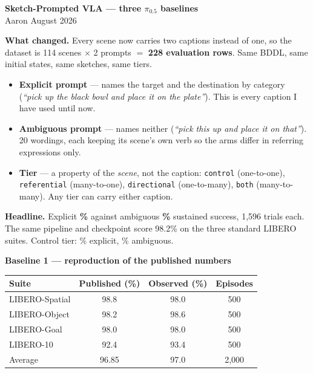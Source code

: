 \documentclass[11pt,a4paper]{article}
\newcommand{\heading}[1]{\vspace{4pt}\noindent\textbf{#1}\par\vspace{1pt}}
\begin{document}
\begin{center}
{\large\textbf{Sketch-Prompted VLA --- three $\pi_{0.5}$ baselines}}\\[2pt]
Aaron \quad\textbar{} August 2026
\end{center}

\vspace{-6pt}
\textbf{What changed.} Every scene now carries two captions instead of one, so
the dataset is 114 scenes $\times$ 2 prompts $=$ \textbf{228 evaluation rows}.
Same BDDL, same initial states, same sketches, same tiers.

\begin{itemize}
  \item \textbf{Explicit prompt} --- names the target and the destination by
    category (\emph{``pick up the black bowl and place it on the plate''}). This
    is every caption I have used until now.
  \item \textbf{Ambiguous prompt} --- names neither (\emph{``pick this up and
    place it on that''}). 20 wordings, each keeping its scene's own verb so the
    arms differ in referring expressions only.
  \item \textbf{Tier} --- a property of the \emph{scene}, not the caption:
    \texttt{control} (one-to-one), \texttt{referential} (many-to-one),
    \texttt{directional} (one-to-many), \texttt{both} (many-to-many). Any tier
    can carry either caption.
\end{itemize}

\textbf{Headline.} Explicit \textbf{\numExplicitOverall\%} against ambiguous
\textbf{\numAmbiguousOverall\%} sustained success, 1{,}596 trials each. The same
pipeline and checkpoint score 98.2\% on the three standard LIBERO suites.
Control tier: \numExplicitControl\% explicit, \numAmbiguousControl\% ambiguous.

\heading{Baseline 1 --- reproduction of the published numbers}

\begin{center}
\footnotesize
\begin{tabular}{lccc}
\toprule
Suite & Published (\%) & Observed (\%) & Episodes \\
\midrule
LIBERO-Spatial & 98.8 & 98.0 & 500 \\
LIBERO-Object  & 98.2 & 98.6 & 500 \\
LIBERO-Goal    & 98.0 & 98.0 & 500 \\
LIBERO-10      & 92.4 & 93.4 & 500 \\
\midrule
Average        & 96.85 & 97.0 & 2{,}000 \\
\bottomrule
\end{tabular}
\end{center}
\end{document}
